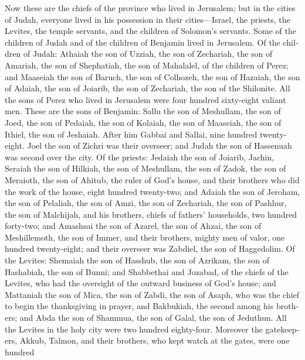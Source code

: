 \begin{paracol}{2}
\begin{otherlanguage}{english}
 Now these are the chiefs of the province who lived in
Jerusalem; but in the cities of Judah, everyone lived in his possession
in their cities---Israel, the priests, the Levites, the temple servants,
and the children of Solomon's servants.  Some of the
children of Judah and of the children of Benjamin lived in Jerusalem. Of
the children of Judah: Athaiah the son of Uzziah, the son of Zechariah,
the son of Amariah, the son of Shephatiah, the son of Mahalalel, of the
children of Perez;  and Maaseiah the son of Baruch, the
son of Colhozeh, the son of Hazaiah, the son of Adaiah, the son of
Joiarib, the son of Zechariah, the son of the Shilonite. 
All the sons of Perez who lived in Jerusalem were four hundred
sixty-eight valiant men.  These are the sons of Benjamin:
Sallu the son of Meshullam, the son of Joed, the son of Pedaiah, the son
of Kolaiah, the son of Maaseiah, the son of Ithiel, the son of Jeshaiah.
 After him Gabbai and Sallai, nine hundred twenty-eight.
 Joel the son of Zichri was their overseer; and Judah the
son of Hassenuah was second over the city.  Of the
priests: Jedaiah the son of Joiarib, Jachin,  Seraiah the
son of Hilkiah, the son of Meshullam, the son of Zadok, the son of
Meraioth, the son of Ahitub, the ruler of God's house, 
and their brothers who did the work of the house, eight hundred
twenty-two; and Adaiah the son of Jeroham, the son of Pelaliah, the son
of Amzi, the son of Zechariah, the son of Pashhur, the son of Malchijah,
 and his brothers, chiefs of fathers' households, two
hundred forty-two; and Amashsai the son of Azarel, the son of Ahzai, the
son of Meshillemoth, the son of Immer,  and their
brothers, mighty men of valor, one hundred twenty-eight; and their
overseer was Zabdiel, the son of Haggedolim.  Of the
Levites: Shemaiah the son of Hasshub, the son of Azrikam, the son of
Hashabiah, the son of Bunni;  and Shabbethai and Jozabad,
of the chiefs of the Levites, who had the oversight of the outward
business of God's house;  and Mattaniah the son of Mica,
the son of Zabdi, the son of Asaph, who was the chief to begin the
thanksgiving in prayer, and Bakbukiah, the second among his brothers;
and Abda the son of Shammua, the son of Galal, the son of Jeduthun.
 All the Levites in the holy city were two hundred
eighty-four.  Moreover the gatekeepers, Akkub, Talmon,
and their brothers, who kept watch at the gates, were one hundred

\end{otherlanguage}
\end{paracol}
